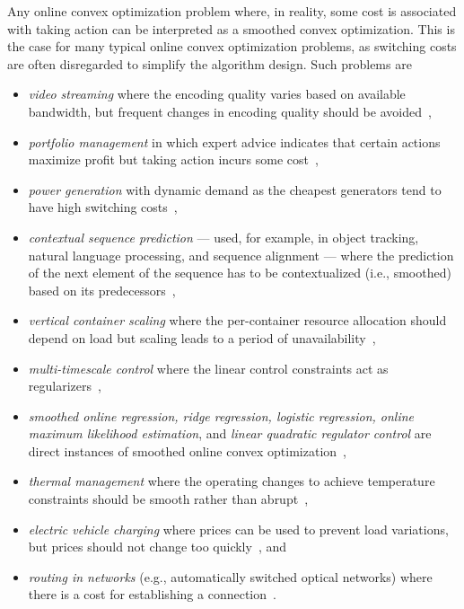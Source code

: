 Any online convex optimization problem where, in reality, some cost is associated with taking action can be interpreted as a smoothed convex optimization. This is the case for many typical online convex optimization problems, as switching costs are often disregarded to simplify the algorithm design. Such problems are

\begin{itemize}
    \item \emph{video streaming} where the encoding quality varies based on available bandwidth, but frequent changes in encoding quality should be avoided~\cite{Lin2012},
    \item \emph{portfolio management} in which expert advice indicates that certain actions maximize profit but taking action incurs some cost~\cite{Calafiore2008, Das2014, Ballu2019},
    \item \emph{power generation} with dynamic demand as the cheapest generators tend to have high switching costs~\cite{Lin2012, Badiei2015},
    \item \emph{contextual sequence prediction} --- used, for example, in object tracking, natural language processing, and sequence alignment --- where the prediction of the next element of the sequence has to be contextualized (i.e., smoothed) based on its predecessors~\cite{Kim2015},
    \item \emph{vertical container scaling} where the per-container resource allocation should depend on load but scaling leads to a period of unavailability~\cite{Rossi2019},
    \item \emph{multi-timescale control} where the linear control constraints act as regularizers~\cite{Goel2017},
    \item \emph{smoothed online regression, ridge regression, logistic regression, online maximum likelihood estimation}, and \emph{linear quadratic regulator control} are direct instances of smoothed online convex optimization~\cite{Goel2018},
    \item \emph{thermal management} where the operating changes to achieve temperature constraints should be smooth rather than abrupt~\cite{Zanini2009},
    \item \emph{electric vehicle charging} where prices can be used to prevent load variations, but prices should not change too quickly~\cite{Kim2014}, and
    \item \emph{routing in networks} (e.g., automatically switched optical networks) where there is a cost for establishing a connection~\cite{Lin2012}.
\end{itemize}
